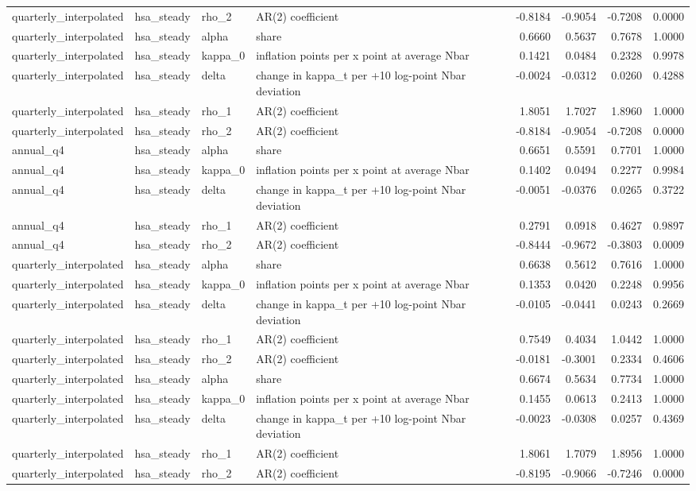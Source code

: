 \begin{tabular}{llllrrrr}
quarterly\_interpolated & hsa\_steady & rho\_2 & AR(2) coefficient & -0.8184 & -0.9054 & -0.7208 & 0.0000 \\
quarterly\_interpolated & hsa\_steady & alpha & share & 0.6660 & 0.5637 & 0.7678 & 1.0000 \\
quarterly\_interpolated & hsa\_steady & kappa\_0 & inflation points per x point at average Nbar & 0.1421 & 0.0484 & 0.2328 & 0.9978 \\
quarterly\_interpolated & hsa\_steady & delta & change in kappa\_t per +10 log-point Nbar deviation & -0.0024 & -0.0312 & 0.0260 & 0.4288 \\
quarterly\_interpolated & hsa\_steady & rho\_1 & AR(2) coefficient & 1.8051 & 1.7027 & 1.8960 & 1.0000 \\
quarterly\_interpolated & hsa\_steady & rho\_2 & AR(2) coefficient & -0.8184 & -0.9054 & -0.7208 & 0.0000 \\
annual\_q4 & hsa\_steady & alpha & share & 0.6651 & 0.5591 & 0.7701 & 1.0000 \\
annual\_q4 & hsa\_steady & kappa\_0 & inflation points per x point at average Nbar & 0.1402 & 0.0494 & 0.2277 & 0.9984 \\
annual\_q4 & hsa\_steady & delta & change in kappa\_t per +10 log-point Nbar deviation & -0.0051 & -0.0376 & 0.0265 & 0.3722 \\
annual\_q4 & hsa\_steady & rho\_1 & AR(2) coefficient & 0.2791 & 0.0918 & 0.4627 & 0.9897 \\
annual\_q4 & hsa\_steady & rho\_2 & AR(2) coefficient & -0.8444 & -0.9672 & -0.3803 & 0.0009 \\
quarterly\_interpolated & hsa\_steady & alpha & share & 0.6638 & 0.5612 & 0.7616 & 1.0000 \\
quarterly\_interpolated & hsa\_steady & kappa\_0 & inflation points per x point at average Nbar & 0.1353 & 0.0420 & 0.2248 & 0.9956 \\
quarterly\_interpolated & hsa\_steady & delta & change in kappa\_t per +10 log-point Nbar deviation & -0.0105 & -0.0441 & 0.0243 & 0.2669 \\
quarterly\_interpolated & hsa\_steady & rho\_1 & AR(2) coefficient & 0.7549 & 0.4034 & 1.0442 & 1.0000 \\
quarterly\_interpolated & hsa\_steady & rho\_2 & AR(2) coefficient & -0.0181 & -0.3001 & 0.2334 & 0.4606 \\
quarterly\_interpolated & hsa\_steady & alpha & share & 0.6674 & 0.5634 & 0.7734 & 1.0000 \\
quarterly\_interpolated & hsa\_steady & kappa\_0 & inflation points per x point at average Nbar & 0.1455 & 0.0613 & 0.2413 & 1.0000 \\
quarterly\_interpolated & hsa\_steady & delta & change in kappa\_t per +10 log-point Nbar deviation & -0.0023 & -0.0308 & 0.0257 & 0.4369 \\
quarterly\_interpolated & hsa\_steady & rho\_1 & AR(2) coefficient & 1.8061 & 1.7079 & 1.8956 & 1.0000 \\
quarterly\_interpolated & hsa\_steady & rho\_2 & AR(2) coefficient & -0.8195 & -0.9066 & -0.7246 & 0.0000 \\
\bottomrule
\end{tabular}
